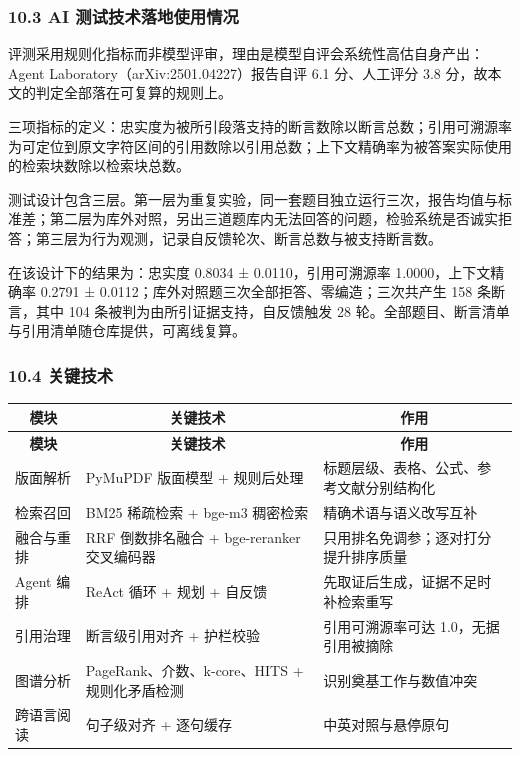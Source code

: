 \documentclass[UTF8,fontset=windows,zihao=5,a4paper]{ctexart}
\begin{document}
\subsubsection*{10.3 AI 测试技术落地使用情况}
评测采用规则化指标而非模型评审，理由是模型自评会系统性高估自身产出：Agent Laboratory（arXiv:2501.04227）报告自评 6.1 分、人工评分 3.8 分，故本文的判定全部落在可复算的规则上。

三项指标的定义：忠实度为被所引段落支持的断言数除以断言总数；引用可溯源率为可定位到原文字符区间的引用数除以引用总数；上下文精确率为被答案实际使用的检索块数除以检索块总数。

测试设计包含三层。第一层为重复实验，同一套题目独立运行三次，报告均值与标准差；第二层为库外对照，另出三道题库内无法回答的问题，检验系统是否诚实拒答；第三层为行为观测，记录自反馈轮次、断言总数与被支持断言数。

在该设计下的结果为：忠实度 0.8034 ± 0.0110，引用可溯源率 1.0000，上下文精确率 0.2791 ± 0.0112；库外对照题三次全部拒答、零编造；三次共产生 158 条断言，其中 104 条被判为由所引证据支持，自反馈触发 28 轮。全部题目、断言清单与引用清单随仓库提供，可离线复算。

\subsubsection*{10.4 关键技术}
\begin{longtable}{@{}p{}p{}p{}@{}}
\toprule
\multicolumn{1}{c}{\textbf{模块}} & \multicolumn{1}{c}{\textbf{关键技术}} & \multicolumn{1}{c}{\textbf{作用}} \\
\midrule
\endfirsthead
\toprule
\multicolumn{1}{c}{\textbf{模块}} & \multicolumn{1}{c}{\textbf{关键技术}} & \multicolumn{1}{c}{\textbf{作用}} \\
\midrule
\endhead
\bottomrule
\endfoot
版面解析 & PyMuPDF 版面模型 + 规则后处理 & 标题层级、表格、公式、参考文献分别结构化 \\
检索召回 & BM25 稀疏检索 + bge-m3 稠密检索 & 精确术语与语义改写互补 \\
融合与重排 & RRF 倒数排名融合 + bge-reranker 交叉编码器 & 只用排名免调参；逐对打分提升排序质量 \\
Agent 编排 & ReAct 循环 + 规划 + 自反馈 & 先取证后生成，证据不足时补检索重写 \\
引用治理 & 断言级引用对齐 + 护栏校验 & 引用可溯源率可达 1.0，无据引用被摘除 \\
图谱分析 & PageRank、介数、k-core、HITS + 规则化矛盾检测 & 识别奠基工作与数值冲突 \\
跨语言阅读 & 句子级对齐 + 逐句缓存 & 中英对照与悬停原句 \\
\end{longtable}
\end{document}
